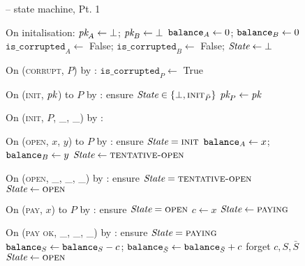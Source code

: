 \begin{figure}[H]
  \begin{systembox}{\fchan -- state machine, Pt. 1}
    \begin{algorithmic}[1]
      \State On initalisation:
      \Indent
        \State $\textit{pk}_{A} \gets \bot$; $\textit{pk}_{B} \gets \bot$
        \State $\texttt{balance}_{A} \gets 0$; $\texttt{balance}_{B} \gets 0$
        \State $\texttt{is\_corrupted}_A \gets$ False; $\texttt{is\_corrupted}_B
        \gets$ False;
        \State $\itistate \gets \bot$
      \EndIndent
      \Statex

      \State On (\textsc{corrupt}, $P$) by \adversary:
      \Indent
        \State $\texttt{is\_corrupted}_P \gets$ True
      \EndIndent
      \Statex

      \State On (\textsc{init}, $\textit{pk}_{}$) to $P$ by \environment:
      \Indent
        \State ensure $\itistate \in \{\bot, \textsc{init}_{\bar{P}}\}$
        \State $\textit{pk}_{P} \gets \textit{pk}_{}$
      \EndIndent
      \Statex

      \State On (\textsc{init}, $P$, \_, \_) by \adversary: 
      \Indent
      \EndIndent
      \Statex

      \State On (\textsc{open}, $x$, $y$) to $P$ by
      \environment:
      \Indent
        \State ensure $\itistate = \textsc{init}$
        \State $\texttt{balance}_{A} \gets x$; $\texttt{balance}_{B} \gets y$
        \State $\itistate \gets \textsc{tentative-open}$
      \EndIndent
      \Statex

      \State On (\textsc{open}, \_, \_, \_) by \adversary:
      \Indent
        \State ensure $\itistate = \textsc{tentative-open}$
        \State $\itistate \gets \textsc{open}$
      \EndIndent
      \Statex

      \State On (\textsc{pay}, $x$) to $P$ by \environment:
      \Indent
        \State ensure $\itistate = \textsc{open}$
        \State $c \gets x$
        \State $\itistate \gets \textsc{paying}$
      \EndIndent
      \Statex

      \State On (\textsc{pay ok}, \_, \_, \_) by \adversary:
      \Indent
        \State ensure $\itistate = \textsc{paying}$
        \State $\texttt{balance}_{S} \gets \texttt{balance}_{S} - c$; $\texttt{balance}_{\bar{S}} \gets
        \texttt{balance}_{\bar{S}} + c$
        \State forget $c, S, \bar{S}$
        \State $\itistate \gets \textsc{open}$
      \EndIndent
    \end{algorithmic}
  \end{systembox}
  \caption{}
  \label{code:functionality:state-machine-1}
\end{figure}

